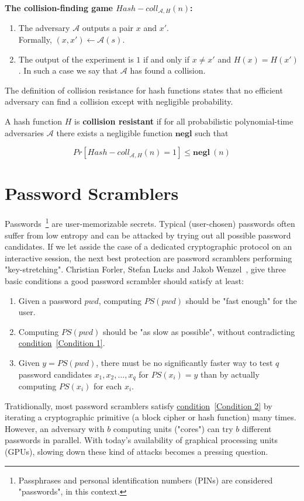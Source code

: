 \textbf{The collision-finding game ${Hash-coll}_{\mathcal{A},H}(n)$:} \cite{Katz:2007:IMC:1206501}
\begin{enumerate}
  \item The adversary $\mathcal{A}$ outputs a pair $x$ and $x'$. \\
  Formally, $(x,x') \leftarrow \mathcal{A}(s)$.
  \item The output of the experiment is $1$ if and only if $x \neq x'$ and $H(x) = H(x')$. In such a case we say that $\mathcal{A}$ has found a collision.
\end{enumerate}
%
The definition of collision resistance for hash functions states that no efficient adversary can find a collision except with negligible probability.
%
\begin{definition} \textnormal{\cite{Katz:2007:IMC:1206501}}
  A hash function $H$ is \textbf{collision resistant} if for all probabilistic polynomial-time adversaries $\mathcal{A}$ there exists a negligible function $\textbf{negl}$ such that

\begin{equation}\label{eqn:collision}
  Pr[{Hash-coll}_{\mathcal{A},H}(n) = 1] \leq \textbf{negl} \: (n)
\end{equation}
\end{definition}
%
\section{Password Scramblers}
Passwords~\footnote{Passphrases and personal identification numbers (PINs) are considered "passwords", in this context.} are user-memorizable secrets. Typical (user-chosen) passwords often suffer from low entropy and can be attacked by trying out all possible password candidates. If we let asside the case of a dedicated cryptographic protocol on an interactive session, the next best protection are password scramblers performing "key-stretching". Christian Forler, Stefan Lucks and Jakob Wenzel~\cite{ForlerLW13}, give three basic conditions a good password scrambler should satisfy at least:

\begin{enumerate}
  \item \label{Condition 1} Given a password $pwd$, computing $PS(pwd)$ should be "fast enough" for the user.
  \item \label{Condition 2} Computing $PS(pwd)$ should be "as slow as possible", without contradicting \hyperref[Condition 1]{condition}~\ref{Condition 1}.
  \item Given $y=PS(pwd)$, there must be no significantly faster way to test $q$ password candidates $x_1, x_2, \dots, x_q$ for $PS(x_i)=y$ than by actually computing $PS(x_i)$ for each $x_i$.
\end{enumerate}
Tratidionally, most password scramblers satisfy \hyperref[Condition 2]{condition}~\ref{Condition 2} by iterating a cryptographic primitive (a block cipher or hash function) many times. However, an adversary with $b$ computing units ("cores") can try $b$ different passwords in parallel. With today's availability of graphical processing units (GPUs), slowing down these kind of attacks becomes a pressing question.
%

